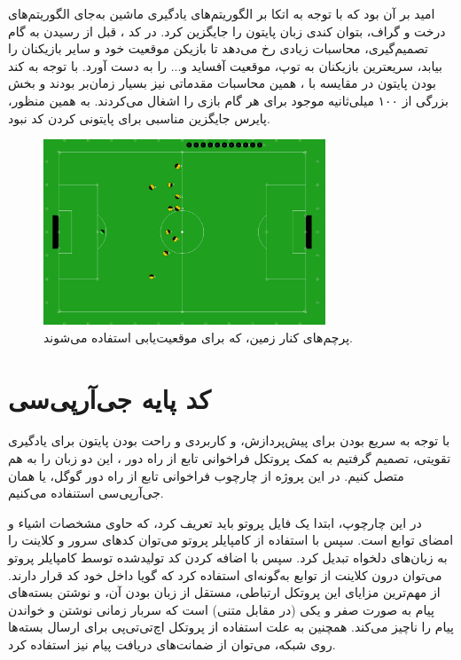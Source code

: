 امید بر آن بود که با توجه به اتکا بر الگوریتم‌های یادگیری ماشین به‌جای الگوریتم‌های درخت و گراف، بتوان کندی زبان پایتون را جایگزین کرد.
در کد ،
قبل از رسیدن به گام تصمیم‌گیری، محاسبات زیادی رخ می‌دهد تا بازیکن موقعیت خود و سایر بازیکنان را بیابد، سریعترین بازیکنان به توپ، موقعیت آفساید و... را به دست آورد.
با توجه به کند بودن پایتون در مقایسه با ،
همین محاسبات مقدماتی نیز بسیار زمان‌بر بودند و بخش بزرگی از ۱۰۰ میلی‌ثانیه موجود برای هر گام بازی را اشغال می‌کردند.
به همین منظور، پایرس جایگزین مناسبی برای پایتونی کردن کد نبود.

\begin{figure}[H]
    \centering
    \includegraphics[width=0.75\textwidth]{images/flags.png}
    \caption{پرچم‌های کنار زمین، که برای موقعیت‌یابی استفاده می‌شوند.}\label{fig:flags}
    
\end{figure}

\section{کد پایه جی‌آر‌پی‌سی}
با توجه به سریع بودن  
برای پیش‌پردازش،
و کاربردی و راحت بودن پایتون برای یادگیری تقویتی،
تصمیم گرفتیم به کمک پروتکل فراخوانی تابع از راه دور ،
این دو زبان را به هم متصل کنیم.
 در این پروژه از چارچوب فراخوانی تابع از راه دور گوگل، یا همان جی‌آر‌پی‌سی 
 استنفاده می‌کنیم.

در این چارچوپ، ابتدا یک فایل پروتو  
باید تعریف کرد، که حاوی مشخصات اشیاء و امضای توابع است. سپس با استفاده از کامپایلر پروتو می‌توان کد‌های سرور و کلاینت را به زبان‌های دلخواه تبدیل کرد.
سپس با اضافه کردن کد تولید‌شده توسط کامپایلر پروتو می‌توان درون کلاینت از توابع به‌گونه‌ای استفاده کرد که گویا داخل خود کد قرار دارند. از مهم‌ترین مزایای
این پروتکل ارتباطی، مستقل از زبان بودن آن، و نوشتن بسته‌های پیام به صورت صفر و یکی (در مقابل متنی)  است که سربار زمانی نوشتن و خواندن پیام را ناچیز می‌کند.
همچنین به علت استفاده از پروتکل اچ‌تی‌تی‌پی  برای ارسال بسته‌ها روی شبکه، 
می‌توان از ضمانت‌های دریافت پیام نیز استفاده کرد.

